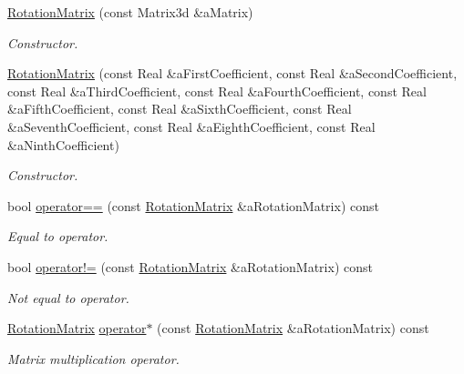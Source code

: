 \begin{DoxyCompactItemize}
\item 
\hyperlink{classostk_1_1math_1_1geom_1_1d3_1_1trf_1_1rot_1_1_rotation_matrix_a5e6bed0779ad7db0c5bf26b2bd96f8ba}{Rotation\+Matrix} (const Matrix3d \&a\+Matrix)
\begin{DoxyCompactList}\small\item\em Constructor. \end{DoxyCompactList}\item 
\hyperlink{classostk_1_1math_1_1geom_1_1d3_1_1trf_1_1rot_1_1_rotation_matrix_ab82d268cc206957afae273a4fe5cc265}{Rotation\+Matrix} (const Real \&a\+First\+Coefficient, const Real \&a\+Second\+Coefficient, const Real \&a\+Third\+Coefficient, const Real \&a\+Fourth\+Coefficient, const Real \&a\+Fifth\+Coefficient, const Real \&a\+Sixth\+Coefficient, const Real \&a\+Seventh\+Coefficient, const Real \&a\+Eighth\+Coefficient, const Real \&a\+Ninth\+Coefficient)
\begin{DoxyCompactList}\small\item\em Constructor. \end{DoxyCompactList}\item 
bool \hyperlink{classostk_1_1math_1_1geom_1_1d3_1_1trf_1_1rot_1_1_rotation_matrix_a4563aa90935b926d8c1c7829ca333941}{operator==} (const \hyperlink{classostk_1_1math_1_1geom_1_1d3_1_1trf_1_1rot_1_1_rotation_matrix}{Rotation\+Matrix} \&a\+Rotation\+Matrix) const
\begin{DoxyCompactList}\small\item\em Equal to operator. \end{DoxyCompactList}\item 
bool \hyperlink{classostk_1_1math_1_1geom_1_1d3_1_1trf_1_1rot_1_1_rotation_matrix_a568d249ecc7071d8bb0d7a903221ee79}{operator!=} (const \hyperlink{classostk_1_1math_1_1geom_1_1d3_1_1trf_1_1rot_1_1_rotation_matrix}{Rotation\+Matrix} \&a\+Rotation\+Matrix) const
\begin{DoxyCompactList}\small\item\em Not equal to operator. \end{DoxyCompactList}\item 
\hyperlink{classostk_1_1math_1_1geom_1_1d3_1_1trf_1_1rot_1_1_rotation_matrix}{Rotation\+Matrix} \hyperlink{classostk_1_1math_1_1geom_1_1d3_1_1trf_1_1rot_1_1_rotation_matrix_a7b3316e6e63d7e82c64df4760be7ac9f}{operator$\ast$} (const \hyperlink{classostk_1_1math_1_1geom_1_1d3_1_1trf_1_1rot_1_1_rotation_matrix}{Rotation\+Matrix} \&a\+Rotation\+Matrix) const
\begin{DoxyCompactList}\small\item\em Matrix multiplication operator. \end{DoxyCompactList}\item 

\end{DoxyCompactItemize}
